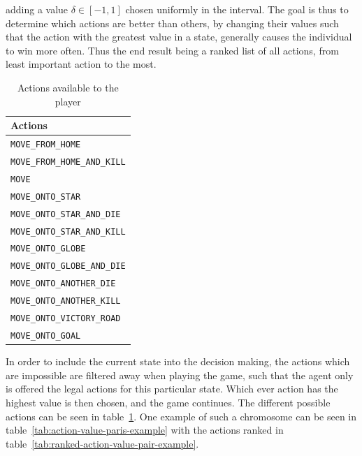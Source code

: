 adding a value $\delta\in[-1,1]$ chosen uniformly in the interval.
The goal is thus to determine which actions are better than others, by changing their values such
that the action with the greatest value in a state, generally causes the individual to win more often.
Thus the end result being a ranked list of all actions, from least important action to the most.\par
\begin{table}
	\begin{center}
		\caption{Actions available to the player}
		\label{tab:actions}
		\begin{tabular}[c]{|l|}
			\hline
			Actions \\ \hline
			\texttt{MOVE\_FROM\_HOME} \\
			\texttt{MOVE\_FROM\_HOME\_AND\_KILL} \\
			\texttt{MOVE} \\
			\texttt{MOVE\_ONTO\_STAR} \\
			\texttt{MOVE\_ONTO\_STAR\_AND\_DIE} \\
			\texttt{MOVE\_ONTO\_STAR\_AND\_KILL} \\
			\texttt{MOVE\_ONTO\_GLOBE} \\
			\texttt{MOVE\_ONTO\_GLOBE\_AND\_DIE} \\
			\texttt{MOVE\_ONTO\_ANOTHER\_DIE} \\
			\texttt{MOVE\_ONTO\_ANOTHER\_KILL} \\
			\texttt{MOVE\_ONTO\_VICTORY\_ROAD} \\
			\texttt{MOVE\_ONTO\_GOAL} \\
			\hline
		\end{tabular}
	\end{center}
\end{table} 
In order to include the current state into the decision making, the actions which are impossible
are filtered away when playing the game, such that the agent only is offered the legal actions 
for this particular state. Which ever action has the highest value is then chosen, 
and the game continues.
The different possible actions can be seen in table~\ref{tab:actions}.
One example of such a chromosome can be seen in table~\ref{tab:action-value-paris-example}
with the actions ranked in table~\ref{tab:ranked-action-value-pair-example}. \par
